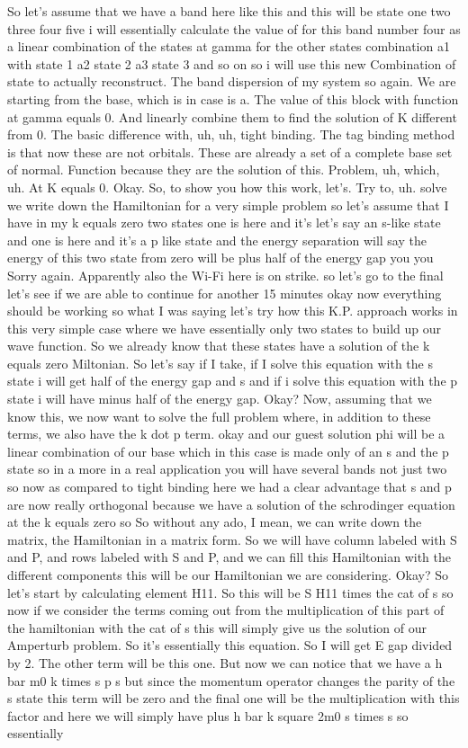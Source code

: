 So let's assume that we have a band here like this and this will be state one two three four five i will essentially calculate the value of for this band number four as a linear combination of the states at gamma for the other states combination a1 with state 1 a2 state 2 a3 state 3 and so on so i will use this new Combination of state to actually reconstruct. The band dispersion of my system so again. We are starting from the base, which is in case is a. The value of this block with function at gamma equals 0. And linearly combine them to find the solution of K different from 0. The basic difference with, uh, uh, tight binding. The tag binding method is that now these are not orbitals. These are already a set of a complete base set of normal. Function because they are the solution of this. Problem, uh, which, uh. At K equals 0. Okay. So, to show you how this work, let's. Try to, uh. solve we write down the Hamiltonian for a very simple problem so let's assume that I have in my k equals zero two states one is here and it's let's say an s-like state and one is here and it's a p like state and the energy separation will say the energy of this two state from zero will be plus half of the energy gap you you Sorry again. Apparently also the Wi-Fi here is on strike. so let's go to the final let's see if we are able to continue for another 15 minutes okay now everything should be working so what I was saying let's try how this K.P. approach works in this very simple case where we have essentially only two states to build up our wave function. So we already know that these states have a solution of the k equals zero Miltonian. So let's say if I take, if I solve this equation with the s state i will get half of the energy gap and s and if i solve this equation with the p state i will have minus half of the energy gap. Okay? Now, assuming that we know this, we now want to solve the full problem where, in addition to these terms, we also have the k dot p term. okay and our guest solution phi will be a linear combination of our base which in this case is made only of an s and the p state so in a more in a real application you will have several bands not just two so now as compared to tight binding here we had a clear advantage that s and p are now really orthogonal because we have a solution of the schrodinger equation at the k equals zero so So without any ado, I mean, we can write down the matrix, the Hamiltonian in a matrix form. So we will have column labeled with S and P, and rows labeled with S and P, and we can fill this Hamiltonian with the different components this will be our Hamiltonian we are considering. Okay? So let's start by calculating element H11. So this will be S H11 times the cat of s so now if we consider the terms coming out from the multiplication of this part of the hamiltonian with the cat of s this will simply give us the solution of our Amperturb problem. So it's essentially this equation. So I will get E gap divided by 2. The other term will be this one. But now we can notice that we have a h bar m0 k times s p s but since the momentum operator changes the parity of the s state this term will be zero and the final one will be the multiplication with this factor and here we will simply have plus h bar k square 2m0 s times s so essentially 